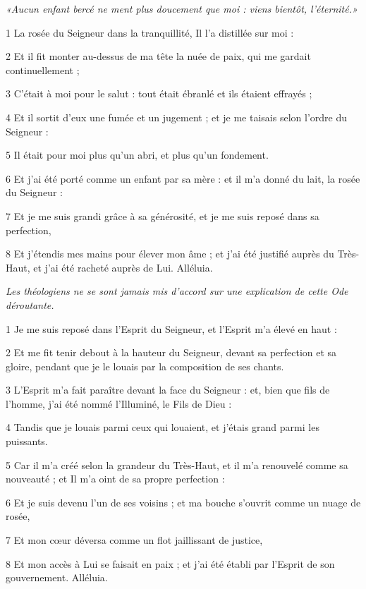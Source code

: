 
\par \textit{«Aucun enfant bercé ne ment plus doucement que moi : viens bientôt, l'éternité.»}

\par 1 La rosée du Seigneur dans la tranquillité, Il l'a distillée sur moi :
\par 2 Et il fit monter au-dessus de ma tête la nuée de paix, qui me gardait continuellement ;
\par 3 C'était à moi pour le salut : tout était ébranlé et ils étaient effrayés ;
\par 4 Et il sortit d'eux une fumée et un jugement ; et je me taisais selon l'ordre du Seigneur :
\par 5 Il était pour moi plus qu'un abri, et plus qu'un fondement.
\par 6 Et j'ai été porté comme un enfant par sa mère : et il m'a donné du lait, la rosée du Seigneur :
\par 7 Et je me suis grandi grâce à sa générosité, et je me suis reposé dans sa perfection,
\par 8 Et j'étendis mes mains pour élever mon âme ; et j'ai été justifié auprès du Très-Haut, et j'ai été racheté auprès de Lui. Alléluia.


\par \textit{Les théologiens ne se sont jamais mis d'accord sur une explication de cette Ode déroutante.}

\par 1 Je me suis reposé dans l'Esprit du Seigneur, et l'Esprit m'a élevé en haut :
\par 2 Et me fit tenir debout à la hauteur du Seigneur, devant sa perfection et sa gloire, pendant que je le louais par la composition de ses chants.
\par 3 L'Esprit m'a fait paraître devant la face du Seigneur : et, bien que fils de l'homme, j'ai été nommé l'Illuminé, le Fils de Dieu :
\par 4 Tandis que je louais parmi ceux qui louaient, et j'étais grand parmi les puissants.
\par 5 Car il m'a créé selon la grandeur du Très-Haut, et il m'a renouvelé comme sa nouveauté ; et Il m'a oint de sa propre perfection :
\par 6 Et je suis devenu l'un de ses voisins ; et ma bouche s'ouvrit comme un nuage de rosée,
\par 7 Et mon cœur déversa comme un flot jaillissant de justice,
\par 8 Et mon accès à Lui se faisait en paix ; et j'ai été établi par l'Esprit de son gouvernement. Alléluia.

